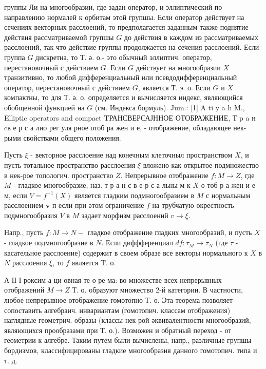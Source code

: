 \documentclass[10pt]{article}
\begin{document}
группы Ли на многообразии, где задан оператор, и эллиптический по направлению нормалей к орбитам этой групшы. Если оператор действует на сечениях векторных расслоений, то предполагается заданным также поднятие действия рассматриваемой групшы $G$ до действия в каждом из рассматриваемых расслоений, так что действие группы продолжается на сечения расслоений. Если группа $G$ дискретна, то Т. ә. о.- это обычный эллиптич. оператор, перестановочный с действием $G$. Если $G$ действует на многообразии $X$ транзитивно, то любой дифференциальный или псевдодифференциальный оператор, перестановочный с действием $G$, является Т. э. о. Если $G$ и $X$ компактны, то для Т. ә. о. определяется и вычисляется индекс, являющийся обобщенной функцией на $G$ (см. Индекса бормуль). Jum.: [1] A ti y a h M., Elliptic operators and compact TРАНСВЕРСАЈННОЕ ОТОБРАЖЕНИЕ, Т p a н cв е р с а лио рег уля рное отоб ра жен и е, - отображение, обладающее нек-рыми свойствами общего положения.



Пусть $\xi$ - векторное расслоение над конечным клеточныл пространством $X$, и пусть тотальное пространство расслоения $\xi$ вложено как открытое подмножество в нек-рое топологич. пространство $Z$. Непрерывное отображение $f: M \rightarrow Z$, где $M$ - гладкое многообразие, наз. т р а н с в е р с а льны м к $X$ о тоб р а жен и е м, если $V=f^{-1}(X)$ является гладким подмногообразием в $M$ с нормальным расслоением $\boldsymbol{v}$ п если при әтом ограничение $f$ на трубчатую окрестность подмногообразия $V$ в $M$ задает морфизм расслоений $v \rightarrow \xi$.



Напр., пусть $f: M \rightarrow N-$ гладкое отображение гладких многообразий, и пусть $X$ - гладкое подмногообразие в $N$. Если диффференциал $d f: \tau_{M} \rightarrow \tau_{N}$ (где $\tau$ - касательное расслоение) содержит в своем образе все векторы нормального к $X$ в $N$ расслоения $\xi$, то $f$ является T. о.



А ІІ І роксим а ци овная те о ре ма: во множестве всех непрерывных отображений $M \rightarrow Z$ Т. о. образуют множество 2-й категории. В частности, любое непрерывное отображение гомотопно Т. о. Эта теорема позволяет сопоставить алгебраич. инвариантам (гомотопич. классам отображения) наглядные геометрич. образы (классы нек-рой әквивалентности многообразий, являющихся прообразами при Т. о.). Возможен и обратный переход - от геометрии к алгебре. Таким путем были вычислены, напр., различные групшы бордизмов, классифицированы гладкие многообразия данного гомотопич. типа и т. д.
\end{document}
